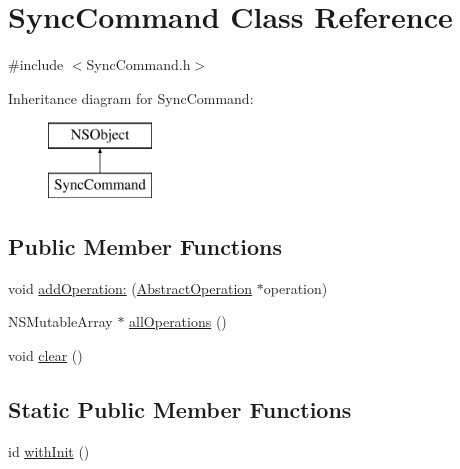 \hypertarget{interface_sync_command}{
\section{\-Sync\-Command \-Class \-Reference}
\label{interface_sync_command}
}


{\ttfamily \#include $<$\-Sync\-Command.\-h$>$}

\-Inheritance diagram for \-Sync\-Command\-:\begin{figure}[H]
\begin{center}
\leavevmode
\includegraphics[height=2.000000cm]{interface_sync_command}
\end{center}
\end{figure}
\subsection*{\-Public \-Member \-Functions}
\begin{DoxyCompactItemize}
\item 
void \hyperlink{interface_sync_command_a69884d51064251d12a74b5e5b833f1ef}{add\-Operation\-:} (\hyperlink{interface_abstract_operation}{\-Abstract\-Operation} $\ast$operation)
\item 
\-N\-S\-Mutable\-Array $\ast$ \hyperlink{interface_sync_command_a8fe0f53bab49a741b3d31c2583310476}{all\-Operations} ()
\item 
void \hyperlink{interface_sync_command_a259b103343b5688abd458d0ed2de2acf}{clear} ()
\end{DoxyCompactItemize}
\subsection*{\-Static \-Public \-Member \-Functions}
\begin{DoxyCompactItemize}
\item 
id \hyperlink{interface_sync_command_a0060988a4e786b06d328679e00bc6807}{with\-Init} ()
\end{DoxyCompactItemize}
